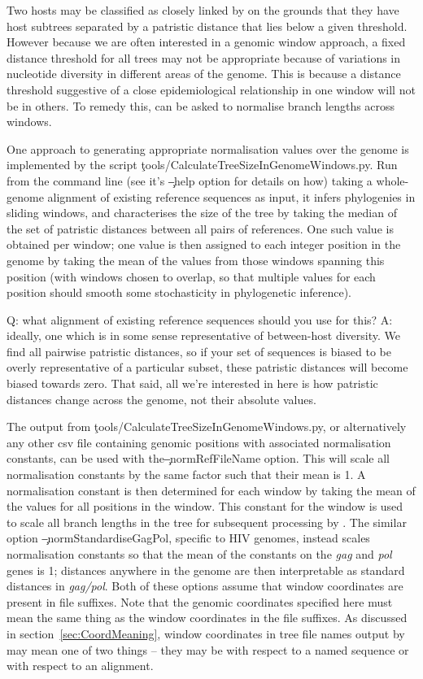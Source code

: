 Two hosts may be classified as closely linked by \pat on the grounds that they have host subtrees separated by a patristic distance that lies below a given threshold.
However because we are often interested in a genomic window approach, a fixed distance threshold for all trees may not be appropriate because of variations in nucleotide diversity in different areas of the genome.
This is because a distance threshold suggestive of a close epidemiological relationship in one window will not be in others.
To remedy this, \pat can be asked to normalise branch lengths across windows.

One approach to generating appropriate normalisation values over the genome is implemented by the script \c{tools/CalculateTreeSizeInGenomeWindows.py}.
Run from the command line (see it's \c{--help} option for details on how) taking a whole-genome alignment of existing reference sequences as input, it infers phylogenies in sliding windows, and characterises the size of the tree by taking the median of the set of patristic distances between all pairs of references.
One such value is obtained per window; one value is then assigned to each integer position in the genome by taking the mean of the values from those windows spanning this position (with windows chosen to overlap, so that multiple values for each position should smooth some stochasticity in phylogenetic inference).

Q: what alignment of existing reference sequences should you use for this?
A: ideally, one which is in some sense representative of between-host diversity.
We find all pairwise patristic distances, so if your set of sequences is biased to be overly representative of a particular subset, these patristic distances will become biased towards zero.
That said, all we're interested in here is how patristic distances change across the genome, not their absolute values.

The output from \c{tools/CalculateTreeSizeInGenomeWindows.py}, or alternatively any other csv file containing genomic positions with associated normalisation constants, can be used with the\break \c{--normRefFileName} option.
This will scale all normalisation constants by the same factor such that their mean is 1.
A normalisation constant is then determined for each window by taking the mean of the values for all positions in the window.
This constant for the window is used to scale all branch lengths in the tree for subsequent processing by \pat.
The similar option \c{--normStandardiseGagPol}, specific to HIV genomes, instead scales normalisation constants so that the mean of the constants on the {\it gag} and {\it pol} genes is 1; distances anywhere in the genome are then interpretable as standard distances in {\it gag/pol}.
Both of these options assume that window coordinates are present in file suffixes.
Note that the genomic coordinates specified here must mean the same thing as the window coordinates in the file suffixes.
As discussed in section~\ref{sec:CoordMeaning}, window coordinates in tree file names output by \pmt may mean one of two things -- they may be with respect to a named sequence or with respect to an alignment.

